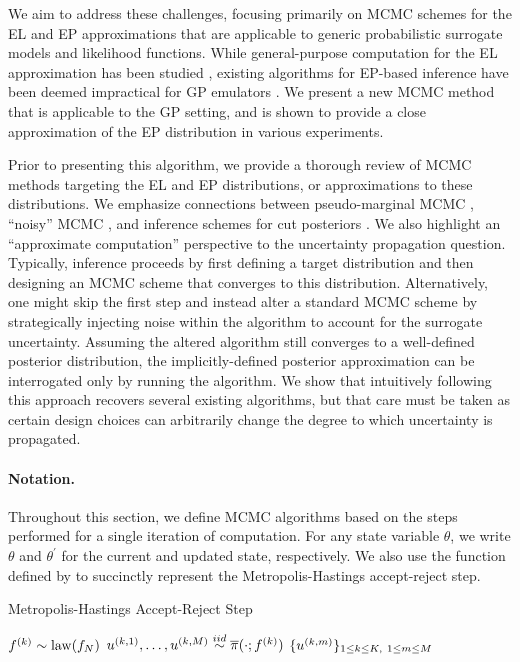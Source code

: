 \documentclass[12pt]{article}
\begin{document}
We aim to address these challenges, focusing primarily on MCMC schemes for the EL
and EP approximations that are applicable to generic probabilistic surrogate models 
and likelihood functions. While general-purpose computation for the EL approximation 
has been studied \citep{garegnani2021NoisyMCMC}, existing algorithms for EP-based 
inference have been deemed impractical for GP emulators \citep{VehtariParallelGP,StuartTeck2}.
We present a new MCMC method that is applicable to the GP setting, and is
shown to provide a close approximation of the EP distribution in various experiments.

Prior to presenting this algorithm, we provide a thorough review of MCMC methods
targeting the EL and EP distributions, or approximations to these distributions. 
We emphasize connections between pseudo-marginal MCMC \citep{pseudoMarginalMCMC}, 
``noisy'' MCMC \citep{noisyMCMC}, and inference schemes for cut 
posteriors \citep{PlummerCut}. We also highlight an ``approximate computation'' 
perspective to the uncertainty propagation question. Typically, inference proceeds
by first defining a target distribution and then designing an MCMC scheme that
converges to this distribution. Alternatively, one might skip the first step and instead 
alter a standard MCMC scheme by strategically injecting noise within the 
algorithm to account for the surrogate uncertainty. Assuming the altered algorithm 
still converges to a well-defined posterior distribution, the implicitly-defined posterior 
approximation can be interrogated only by running the algorithm.
We show that intuitively following this approach recovers several existing algorithms, 
but that care must be taken as certain design choices can arbitrarily change the 
degree to which uncertainty is propagated.

\paragraph{Notation.} Throughout this section, we define MCMC algorithms
based on the steps performed for a single iteration of computation. For any 
state variable $\theta$, we write $\theta$ and $\theta^\prime$ for the current
and updated state, respectively. We also use the function defined by 
 to succinctly represent the Metropolis-Hastings
accept-reject step.

\begin{algorithm}[H]
    \caption{Metropolis-Hastings Accept-Reject Step}
    \label{alg:acc-rej}
    \begin{algorithmic}[1]
    \Function{$\AR$}{$\Par$, $\propPar$, $\targetTraj$, $\targetTrajProp$}     
        		\State $f^{(k)} \sim \mathrm{law}(f_{N})$ 
		\State $u^{(k, 1)}, \dots, u^{(k, M)} \overset{iid}{\sim} \overline{\pi}(\cdot; f^{(k)})$ 
	\EndFor
	\State \Return $\{u^{(k, m)}\}_{1 \leq k \leq K, \ 1 \leq m \leq M}$
	\EndFunction
    \end{algorithmic}
\end{algorithm}
\end{document}
